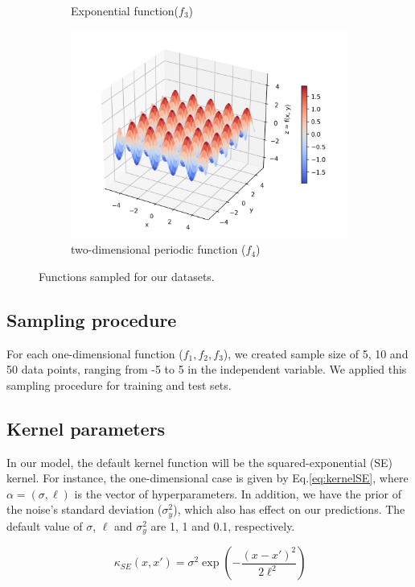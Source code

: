 \documentclass{article}
\begin{document}
\begin{figure}[ht]
\begin{subfigure}{.5\textwidth}
    \caption{Exponential function($f_3$)}
  \end{subfigure}
  \begin{subfigure}{.5\textwidth}
    \centering
    \includegraphics[width=.8\linewidth]{functions/sinx+cosy.png}
    \caption{two-dimensional periodic function ($f_4$)}
  \end{subfigure}
  \caption{Functions sampled for our datasets.}
  \label{fig:1}
\end{figure}

\subsection{Sampling procedure}

For each one-dimensional function ($f_1, f_2, f_3$), we created sample size of 5, 10 and 50 data points, ranging from -5 to 5 in the independent variable. We applied this sampling procedure for training and test sets.

\subsection{Kernel parameters}

In our model, the default kernel function will be the squared-exponential (SE) kernel. For instance, the one-dimensional case is given by Eq.\eqref{eq:kernelSE}, where $\alpha = (\sigma, \ell)$ is the vector of hyperparameters. In addition, we have the prior of the noise's standard deviation ($\sigma_y^2$), which also has effect on our predictions. The default value of $\sigma$, $\ell$ and $\sigma_y^2$ are 1, 1 and 0.1, respectively.

\begin{equation}\
  \label{eq:kernelSE}
  \kappa_{SE}(x,x') = \sigma^2 \exp{\left(-\dfrac{(x-x')^2}{2\ell^2}\right)}
\end{equation} 
\end{document}
